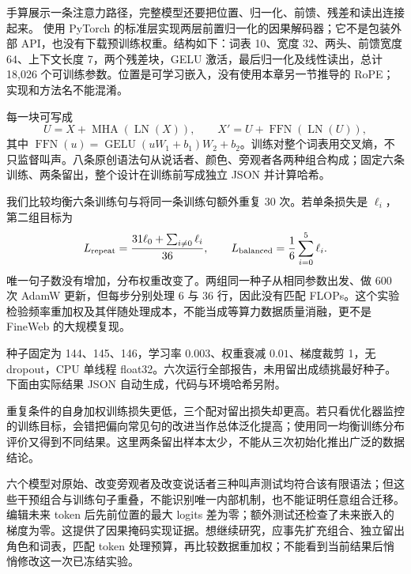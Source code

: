 \label{sec:standard-model}
手算展示一条注意力路径，完整模型还要把位置、归一化、前馈、残差和读出连接起来。 使用 PyTorch 的标准层实现两层前置归一化的因果解码器；它不是包装外部 API，也没有下载预训练权重。结构如下：词表 10、宽度 $32$、两头、前馈宽度 $64$、上下文长度 7，两个残差块，GELU 激活，最后归一化及线性读出，总计 18,026 个可训练参数。位置是可学习嵌入，没有使用本章另一节推导的 RoPE；实现和方法名不能混淆。

每一块可写成
\[
U=X+\operatorname{MHA}(\operatorname{LN}(X)),\qquad
X'=U+\operatorname{FFN}(\operatorname{LN}(U)),
\]
其中 $\operatorname{FFN}(u)=\operatorname{GELU}(uW_1+b_1)W_2+b_2$。训练对整个词表用交叉熵，不只监督叫声。八条原创语法句从说话者、颜色、旁观者各两种组合构成；固定六条训练、两条留出，整个设计在训练前写成独立 JSON 并计算哈希。

我们比较均衡六条训练句与将同一条训练句额外重复 30 次。若单条损失是 $\ell_i$，第二组目标为
\[
L_{\rm repeat}=\frac{31\ell_0+\sum_{i\ne0}\ell_i}{36},
\qquad L_{\rm balanced}=\frac16\sum_{i=0}^5\ell_i.
\]
唯一句子数没有增加，分布权重改变了。两组同一种子从相同参数出发、做 600 次 AdamW 更新，但每步分别处理 6 与 36 行，因此没有匹配 FLOPs。这个实验检验频率重加权及其伴随处理成本，不能当成等算力数据质量消融，更不是 FineWeb 的大规模复现。

种子固定为 144、145、146，学习率 $0.003$、权重衰减 $0.01$、梯度裁剪 1，无 dropout，CPU 单线程 float32。六次运行全部报告，未用留出成绩挑最好种子。下面由实际结果 JSON 自动生成，代码与环境哈希另附。

重复条件的自身加权训练损失更低，三个配对留出损失却更高。若只看优化器监控的训练目标，会错把偏向常见句的改进当作总体泛化提高；使用同一均衡训练分布评价又得到不同结果。这里两条留出样本太少，不能从三次初始化推出广泛的数据结论。

六个模型对原始、改变旁观者及改变说话者三种叫声测试均符合该有限语法；但这些干预组合与训练句子重叠，不能识别唯一内部机制，也不能证明任意组合迁移。编辑未来 token 后先前位置的最大 logits 差为零；额外测试还检查了未来嵌入的梯度为零。这提供了因果掩码实现证据。想继续研究，应事先扩充组合、独立留出角色和词表，匹配 token 处理预算，再比较数据重加权；不能看到当前结果后悄悄修改这一次已冻结实验。
